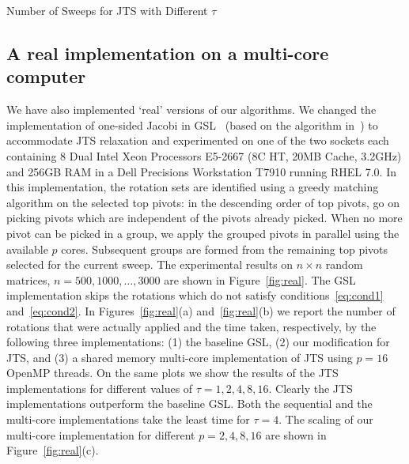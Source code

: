 \documentclass[10pt, conference, compsocconf]{IEEEtran}
\begin{document}

\begin{table}
  \centering
  \caption{Number of Sweeps for JTS with Different $\tau$}
  \label{tab:varyk}
  
\end{table}

\subsection{A real implementation on a multi-core computer}

We have also implemented `real' versions of our algorithms. We changed the implementation of one-sided Jacobi in GSL~\cite{galassi1996gnu} (based on the algorithm in~\cite{nash1975one}) to accommodate JTS relaxation and experimented on one of the two sockets each containing 8 Dual Intel Xeon Processors E5-2667 (8C HT, 20MB Cache, 3.2GHz) and 256GB RAM in a Dell Precisions Workstation T7910 running RHEL 7.0. In this implementation, the rotation sets are identified using a greedy matching algorithm on the selected top pivots: in the descending order of top pivots, go on picking pivots which are independent of the pivots already picked. When no more pivot can be picked in a group, we apply the grouped pivots in parallel using the available $p$ cores. Subsequent groups are formed from the remaining top pivots selected for the current sweep. The experimental results on $n \times n$ random matrices, $n=500, 1000, \ldots, 3000$ are shown in Figure~\ref{fig:real}. The GSL implementation skips the rotations which do not satisfy conditions~\eqref{eq:cond1} and~\eqref{eq:cond2}. In Figures~\ref{fig:real}(a) and~\ref{fig:real}(b) we report the number of rotations that were actually applied and the time taken, respectively, by the following three implementations: (1) the baseline GSL, (2) our modification for JTS, and (3) a shared memory multi-core implementation of JTS using $p{=}16$ OpenMP threads. On the same plots we show the results of the JTS implementations for different values of $\tau {=} 1, 2, 4, 8, 16$. Clearly the JTS implementations outperform the baseline GSL. Both the sequential and the multi-core implementations take the least time for $\tau {=} 4$. The scaling of our multi-core implementation for different $p=2, 4, 8, 16$ are shown in Figure~\ref{fig:real}(c).
\end{document}
